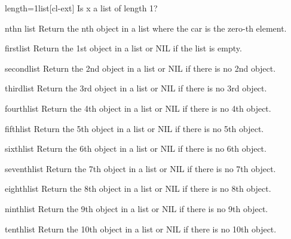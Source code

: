 \documentclass[10pt,english]{book}
\begin{document}
\begin{function}{length=1}{list}[cl-ext]
  Is x a list of length 1?
\end{function}

\begin{accessor}{nth}{n list}
  Return the nth object in a list where the car is the zero-th element.
\end{accessor}

\begin{accessor}{first}{list}
  Return the 1st object in a list or NIL if the list is empty.
\end{accessor}

\begin{accessor}{second}{list}
  Return the 2nd object in a list or NIL if there is no 2nd object.
\end{accessor}

\begin{accessor}{third}{list}
  Return the 3rd object in a list or NIL if there is no 3rd object.
\end{accessor}

\begin{accessor}{fourth}{list}
  Return the 4th object in a list or NIL if there is no 4th object.
\end{accessor}

\begin{accessor}{fifth}{list}
  Return the 5th object in a list or NIL if there is no 5th object.
\end{accessor}

\begin{accessor}{sixth}{list}
  Return the 6th object in a list or NIL if there is no 6th object.
\end{accessor}

\begin{accessor}{seventh}{list}
  Return the 7th object in a list or NIL if there is no 7th object.
\end{accessor}

\begin{accessor}{eighth}{list}
  Return the 8th object in a list or NIL if there is no 8th object.
\end{accessor}

\begin{accessor}{ninth}{list}
  Return the 9th object in a list or NIL if there is no 9th object.
\end{accessor}

\begin{accessor}{tenth}{list}
  Return the 10th object in a list or NIL if there is no 10th object.
\end{accessor}
\end{document}
